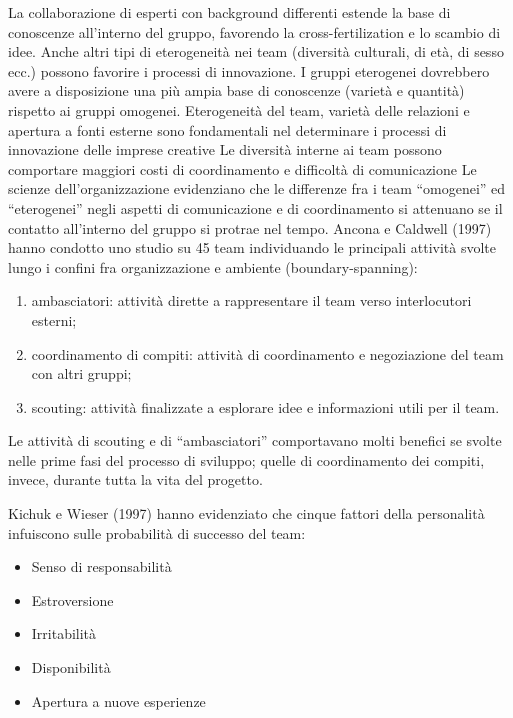 \documentclass{article}
\begin{document}
La collaborazione di esperti con background differenti
estende la base di conoscenze all’interno del gruppo,
favorendo la cross-fertilization e lo scambio di idee.
Anche altri tipi di eterogeneità nei team (diversità culturali, di età, di
sesso ecc.) possono favorire i processi di innovazione.
I gruppi eterogenei dovrebbero avere a disposizione una più ampia base di
conoscenze (varietà e quantità) rispetto ai gruppi omogenei.
Eterogeneità del team, varietà delle relazioni e apertura a fonti esterne sono
fondamentali nel determinare i processi di innovazione delle imprese creative
Le diversità interne ai team possono comportare maggiori costi di
coordinamento e difficoltà di comunicazione
Le scienze dell’organizzazione evidenziano che le differenze fra i
team “omogenei” ed “eterogenei” negli aspetti di comunicazione e di
coordinamento si attenuano se il contatto all’interno del gruppo si
protrae nel tempo.
Ancona e Caldwell (1997) hanno condotto uno studio su 45 team
individuando le principali attività svolte lungo i confini fra
organizzazione e ambiente (boundary-spanning):
\begin{enumerate}
	\item ambasciatori: attività dirette a rappresentare il team verso
	interlocutori esterni;
	\item coordinamento di compiti: attività di coordinamento e
	negoziazione del team con altri gruppi;
	\item  scouting: attività finalizzate a esplorare idee e informazioni utili
	per il team.
\end{enumerate}

Le attività di scouting e di “ambasciatori” comportavano molti benefici
se svolte nelle prime fasi del processo di sviluppo; quelle di
coordinamento dei compiti, invece, durante tutta la vita del progetto.

Kichuk e Wieser (1997) hanno evidenziato che cinque fattori della
personalità infuiscono sulle probabilità di successo del team:
\begin{itemize}
\item Senso di responsabilità
\item Estroversione
\item Irritabilità
\item Disponibilità
\item Apertura a nuove esperienze
\end{itemize}
\end{document}
